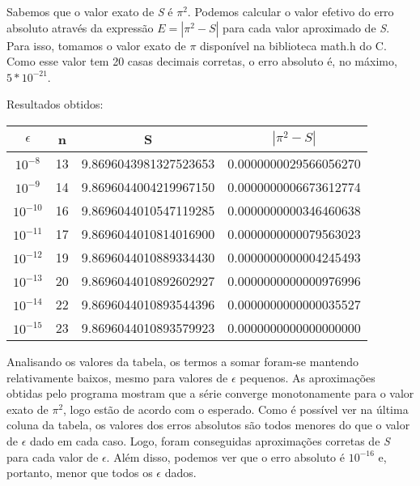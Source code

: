 \documentclass[12pt, letterpaper]{article}
\begin{document}
Sabemos que o valor exato de \textit{S} é $\pi^2$. Podemos calcular o valor efetivo do erro absoluto através da expressão $E = |\pi^2 - S|$ para cada valor aproximado de \textit{S}. Para isso, tomamos o valor exato de $\pi$ disponível na biblioteca math.h do C. Como esse valor tem 20 casas decimais corretas, o erro absoluto é, no máximo, $5*10^{-21}$.

Resultados obtidos:
\begin{center}
    \begin{tabular}{|| c | c | c | c ||}       \hline
 $\epsilon$ & n & S & $|\pi^2 - S|$\\  [0.4ex] \hline\hline
 $10^{-8}$  & 13 & 9.8696043981327523653 & 0.0000000029566056270 \\  \hline
 $10^{-9}$  & 14 & 9.8696044004219967150 & 0.0000000006673612774 \\  \hline
 $10^{-10}$ & 16 & 9.8696044010547119285 & 0.0000000000346460638 \\  \hline
 $10^{-11}$ & 17 & 9.8696044010814016900 & 0.0000000000079563023 \\  \hline
 $10^{-12}$ & 19 & 9.8696044010889334430 & 0.0000000000004245493 \\  \hline
 $10^{-13}$ & 20 & 9.8696044010892602927 & 0.0000000000000976996 \\  \hline
 $10^{-14}$ & 22 & 9.8696044010893544396 & 0.0000000000000035527 \\  \hline
 $10^{-15}$ & 23 & 9.8696044010893579923 & 0.0000000000000000000 \\ [0.4ex]\hline
    \end{tabular}
\end{center}

Analisando os valores da tabela, os termos a somar foram-se mantendo relativamente baixos, mesmo para valores de $\epsilon$ pequenos. As aproximações obtidas pelo programa mostram que a série converge monotonamente para o valor exato de $\pi^2$, logo estão de acordo com o esperado.
Como é possível ver na última coluna da tabela, os valores dos erros absolutos são todos menores do que o valor de $\epsilon$ dado em cada caso. Logo, foram conseguidas aproximações corretas de \textit{S} para cada valor de $\epsilon$. Além disso, podemos ver que o erro absoluto é $10^{-16}$ e, portanto, menor que todos os $\epsilon$ dados.
\end{document}
